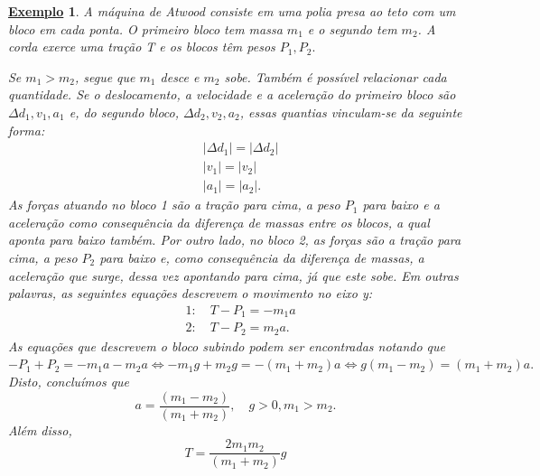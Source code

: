 \documentclass{article}
\newtheorem{example}{\underline{Exemplo}}
\begin{document}
 \begin{example}
   A máquina de Atwood consiste em uma polia presa ao teto com um bloco em cada ponta. O primeiro bloco tem massa
   $m_{1}$ e o segundo tem $m_{2}$. A corda exerce uma tração T e os blocos têm pesos $P_{1}, P_{2}.$ 

   Se $m_{1}>m_{2}$, segue que $m_{1}$ desce e $m_{2}$ sobe. Também é possível relacionar cada quantidade.
   Se o deslocamento, a velocidade e a aceleração do primeiro bloco são $\Delta d_{1}, v_{1}, a_{1}$ e, do segundo bloco,
   $\Delta d_{2}, v_{2}, a_{2}$, essas quantias vinculam-se da seguinte forma:
  \begin{align*}
    &|\Delta d_{1}| = |\Delta d_{2}|\\
    &|v_{1}| = |v_{2}|\\
    &|a_{1}| = |a_{2}|.
  \end{align*}
    As forças atuando no bloco 1 são a tração para cima, a peso $P_{1}$ para baixo e a aceleração como consequência da
    diferença de massas entre os blocos, a qual aponta para baixo também. Por outro lado, no bloco 2, as forças são
    a tração para cima, a peso $P_{2}$ para baixo e, como consequência da diferença de massas, a aceleração que surge,
    dessa vez apontando para cima, já que este sobe. Em outras palavras, as seguintes equações descrevem o movimento no
    eixo y:
   \begin{align*}
     &1:\quad T-P_{1} = -m_{1}a\\
     &2:\quad T-P_{2} = m_{2}a.
   \end{align*}
   As equações que descrevem o bloco subindo podem ser encontradas notando que $-P_{1}+P_{2}=-m_{1}a-m_{2}a \Longleftrightarrow 
   -m_{1}g + m_{2}g = -(m_{1}+m_{2})a \Longleftrightarrow  g(m_{1}-m_{2}) = (m_{1}+m_{2})a.$ Disto, concluímos que 
     $$
       a = \frac{(m_{1}-m_{2})}{(m_{1}+m_{2})},\quad g>0, m_{1}>m_{2}.
     $$
     Além disso, 
       $$
         T = \frac{2m_{1}m_{2}}{(m_{1}+m_{2})}g
       $$
 \end{example}
\end{document}
